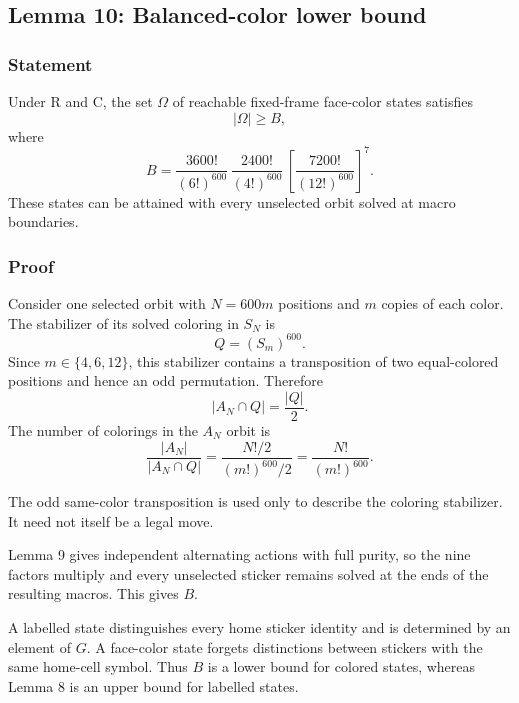 \documentclass[
  10pt,
  a4paper,
]{article}
\begin{document}
\subsection{Lemma 10: Balanced-color lower
bound}\label{lemma-10-balanced-color-lower-bound}

\subsubsection{Statement}\label{statement-9}

Under R and C, the set \(\Omega\) of reachable fixed-frame face-color
states satisfies \begin{equation}
|\Omega|\ge B,
\end{equation} where \begin{equation}
B=
\frac{3600!}{(6!)^{600}}\,
\frac{2400!}{(4!)^{600}}\,
\left[\frac{7200!}{(12!)^{600}}\right]^7.
\end{equation} These states can be attained with every unselected orbit
solved at macro boundaries.

\subsubsection{Proof}\label{proof-9}

Consider one selected orbit with \(N=600m\) positions and \(m\) copies
of each color. The stabilizer of its solved coloring in \(S_N\) is
\begin{equation}
Q=(S_m)^{600}.
\end{equation} Since \(m\in\{4,6,12\}\), this stabilizer contains a
transposition of two equal-colored positions and hence an odd
permutation. Therefore \begin{equation}
|A_N\cap Q|=\frac{|Q|}{2}.
\end{equation} The number of colorings in the \(A_N\) orbit is
\begin{equation}
\frac{|A_N|}{|A_N\cap Q|}
=
\frac{N!/2}{(m!)^{600}/2}
=
\frac{N!}{(m!)^{600}}.
\end{equation}

The odd same-color transposition is used only to describe the coloring
stabilizer. It need not itself be a legal move.

Lemma 9 gives independent alternating actions with full purity, so the
nine factors multiply and every unselected sticker remains solved at the
ends of the resulting macros. This gives \(B\).

A labelled state distinguishes every home sticker identity and is
determined by an element of \(G\). A face-color state forgets
distinctions between stickers with the same home-cell symbol. Thus \(B\)
is a lower bound for colored states, whereas Lemma 8 is an upper bound
for labelled states.
\end{document}
